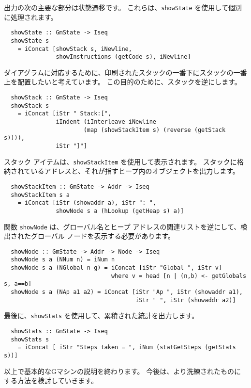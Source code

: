 \documentclass{jarticle}
\begin{document}
出力の次の主要な部分は状態遷移です。 これらは、\texttt{showState} を使用して個別に処理されます。

\begin{verbatim}
  showState :: GmState -> Iseq
  showState s
    = iConcat [showStack s, iNewline,
               showInstructions (getCode s), iNewline]
\end{verbatim}

ダイアグラムに対応するために、印刷されたスタックの一番下にスタックの一番上を配置したいと考えています。
この目的のために、スタックを逆にします。

\begin{verbatim}
  showStack :: GmState -> Iseq
  showStack s
    = iConcat [iStr " Stack:[",
               iIndent (iInterleave iNewline
                       (map (showStackItem s) (reverse (getStack s)))),
               iStr "]"]
\end{verbatim}

スタック アイテムは、\texttt{showStackItem} を使用して表示されます。
スタックに格納されているアドレスと、それが指すヒープ内のオブジェクトを出力します。

\begin{verbatim}
  showStackItem :: GmState -> Addr -> Iseq
  showStackItem s a
    = iConcat [iStr (showaddr a), iStr ": ",
               showNode s a (hLookup (getHeap s) a)]
\end{verbatim}

関数 \texttt{showNode} は、グローバル名とヒープ アドレスの関連リストを逆にして、検出されたグローバル ノードを表示する必要があります。

\begin{verbatim}
  showNode :: GmState -> Addr -> Node -> Iseq
  showNode s a (NNum n) = iNum n
  showNode s a (NGlobal n g) = iConcat [iStr "Global ", iStr v]
                               where v = head [n | (n,b) <- getGlobals s, a==b]
  showNode s a (NAp a1 a2) = iConcat [iStr "Ap ", iStr (showaddr a1),
                                      iStr " ", iStr (showaddr a2)]
\end{verbatim}

最後に、\texttt{showStats} を使用して、累積された統計を出力します。

\begin{verbatim}
  showStats :: GmState -> Iseq
  showStats s
    = iConcat [ iStr "Steps taken = ", iNum (statGetSteps (getStats s))]
\end{verbatim}

以上で基本的なGマシンの説明を終わります。
今後は、より洗練されたものにする方法を検討していきます。
\end{document}
